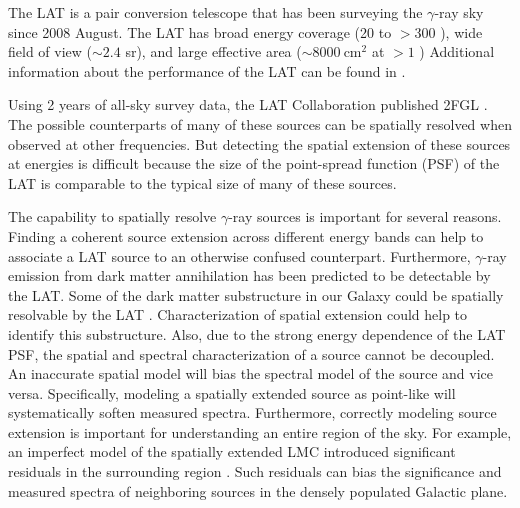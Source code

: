 \documentclass[12pt,preprint]{aastex}
\newcommand{\mev}{\text{MeV}\xspace}
\newcommand{\gev}{\text{GeV}\xspace}
\newcommand{\cm}{\text{cm}\xspace}
\begin{document}
The LAT is a pair conversion telescope that has been surveying the
$\gamma$-ray sky since 2008 August.  The LAT has broad energy coverage
(20 \mev to $>300$ \gev), wide field of view ($\sim 2.4$ sr), and large
effective area ($\sim 8000\ \cm^2$ at $>1$ \gev) 
Additional information about the performance of the LAT can be found in
\cite{atwood_LAT_mission}.

Using 2 years of all-sky survey data, the LAT Collaboration published
2FGL \citep[2FGL,][]{second_cat}.
The possible counterparts of many of these sources can be spatially resolved
when observed at other frequencies. But detecting the spatial extension
of these sources at \gev energies is difficult because the size of the
point-spread function (PSF) of the LAT is comparable to the typical size
of many of these sources.

The capability to spatially resolve \gev $\gamma$-ray
sources is important for several reasons.  
Finding a coherent source extension across different energy bands can
help to associate a LAT source to an otherwise confused counterpart.
Furthermore, $\gamma$-ray emission from dark matter
annihilation has been predicted to be detectable by the LAT.
Some of the dark matter substructure in our Galaxy 
could be spatially resolvable by the LAT \citep{pre_luanch_dark_matter_fermi}.  
Characterization of spatial extension could help to identify this substructure.
Also,
due to the strong energy dependence of the LAT PSF, the spatial and
spectral characterization of a source cannot be
decoupled. An inaccurate
spatial model will bias the spectral model of the source and vice versa. Specifically,
modeling a spatially extended source as point-like will systematically
soften measured spectra. Furthermore, correctly
modeling source extension is important for 
understanding an entire region of the sky. For example,
an imperfect model of the spatially extended LMC introduced
significant residuals in the surrounding region \citep{first_cat,second_cat}.
Such residuals can bias the significance and measured spectra of
neighboring sources in the densely populated Galactic plane.
\end{document}

